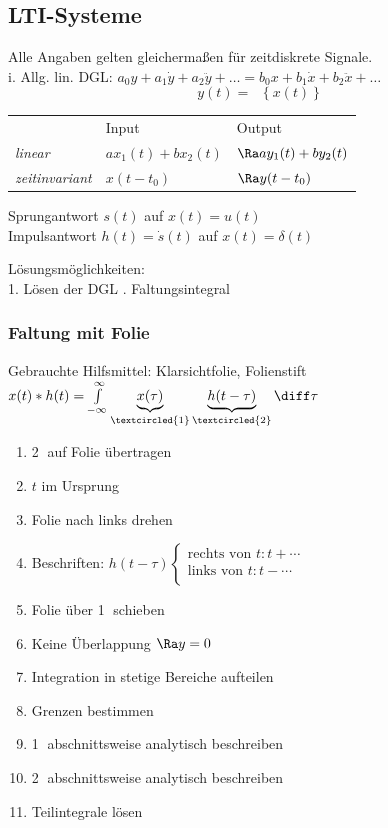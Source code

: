 \documentclass[6pt,a4paper]{scrartcl}
\DeclareMathOperator{\TransSymb}{\overline{\mathbf{T}}} %
\newcommand{\Trans}[1]{\TransSymb\left\{#1\right\}}	%
\begin{document}
\begin{multicols}{4}
	\subsection{LTI-Systeme}
	Alle Angaben gelten gleichermaßen für zeitdiskrete Signale.\\
	i. Allg. lin. DGL: $a_0 y + a_1 \dot{y} + a_2 \ddot{y} + \dots = b_0 x + b_1 \dot{x} + b_2 \ddot{x} + \dots$
	\[\boxed{y(t) = \Trans{x(t)}}\]
	\begin{tabular}{@{}lll}
		& Input & Output\\
		\emph{linear} & $a x_1(t) + b x_2(t)$ & $\Ra a y_1(t) + b y_2(t)$\\
		\emph{zeitinvariant} & $x(t-t_0)$ & $\Ra y(t-t_0)$\\
	\end{tabular}
	
	Sprungantwort $s(t)$ auf $x(t) = u(t)$\\
	Impulsantwort $h(t) = \dot s(t)$ auf $x(t) = \delta(t)$
	
	Lösungsmöglichkeiten:\\
	1. Lösen der DGL . Faltungsintegral\\
	
	\subsubsection*{Faltung mit Folie}
	Gebrauchte Hilfsmittel: Klarsichtfolie, Folienstift\\
	$x(t) \ast h(t) = \int\limits_{-\infty}^{\infty}{\underbrace{x(\tau)}_{\textcircled{1}} \underbrace{h(t - \tau)}_{\textcircled{2}} \diff \tau}$
	\begin{enumerate}
		\item \textcircled{2} auf Folie übertragen
		\item $t$ im Ursprung
		\item Folie nach links drehen
		\item Beschriften: $h(t - \tau) \begin{cases}
			\text{rechts von }t: t + \cdots\\
			\text{links von }t: t - \cdots\\
		\end{cases}$
		\item Folie über \textcircled{1} schieben
		\item Keine Überlappung $\Ra y = 0$
		\item Integration in stetige Bereiche aufteilen
		\item Grenzen bestimmen
		\item \textcircled{1} abschnittsweise analytisch beschreiben
		\item \textcircled{2} abschnittsweise analytisch beschreiben
		\item Teilintegrale lösen
	\end{enumerate}
	

\end{multicols}
\end{document}
